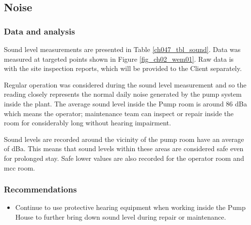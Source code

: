 \subsection{Noise}\label{aq06}
\subsubsection{Data and analysis}
Sound level measurements are presented in Table \ref{ch047_tbl_sound}. Data was measured at targeted points shown in Figure \ref{fig_ch02_wem01}. Raw data is with the site inspection reports, which will be provided to the Client separately.  



Regular operation was considered during the sound level measurement and so the reading closely represents the normal daily noise generated by the pump system inside the plant. The average sound level inside the Pump room is around 86 dBa which means the operator; maintenance team can inspect or repair inside the room for considerably long without hearing impairment.

Sound levels are recorded around the vicinity of the pump room have an average of dBa. This means that sound levels within these areas are considered safe even for prolonged stay. Safe lower values are also recorded for the operator room and mcc room.


\subsubsection{Recommendations}

\begin{itemize}
	\item	Continue to use protective hearing equipment when working inside the Pump House to further bring down sound level during repair or maintenance.
\end{itemize}


